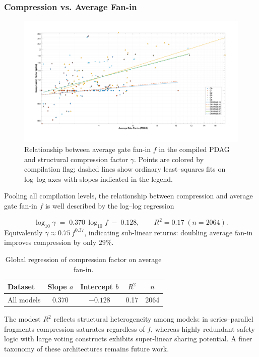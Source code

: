 \subsubsection{Compression vs. Average Fan-in}
\label{sec:kc_micro_fanin}
\begin{landscape}
\begin{figure}[hb]
    \centering
    \includegraphics[width=1.15\textwidth]{figs/compiler/compiler_fanin_vs_compression.png}
    \caption{Relationship between average gate fan-in $f$ in the compiled PDAG and structural compression factor $\gamma$.  Points are colored by compilation flag; dashed lines show ordinary least–squares fits on log--log axes with slopes indicated in the legend.}
    \label{fig:compiler_fanin_compression}
\end{figure}
\end{landscape}

Pooling all compilation levels, the relationship between compression
and average gate fan-in $f$ is well described by the log–log regression

\[
  \log_{10}\gamma \;=\; 0.370\,\log_{10}f \; - \; 0.128,
  \qquad R^{2}=0.17\;(n=2064).
\]
Equivalently
$\gamma\approx0.75\,f^{0.37}$, indicating sub-linear returns: doubling
average fan-in improves compression by only $29\%$.

\begin{table}[t]
  \centering
  \caption{Global regression of compression factor on average fan-in.}
  \label{tab:micro_fanin_global}
  \begin{tabular}{lcccc}
    \toprule
    Dataset & Slope $a$ & Intercept $b$ & $R^{2}$ & $n$ \\
    \midrule
    All models & 0.370 & $-0.128$ & 0.17 & 2064 \\
    \bottomrule
  \end{tabular}
\end{table}

The modest $R^{2}$ reflects structural heterogeneity among models: in
series–parallel fragments compression saturates regardless of $f$,
whereas highly redundant safety logic with large voting constructs
exhibits super-linear sharing potential.  A finer taxonomy of these
architectures remains future work.
